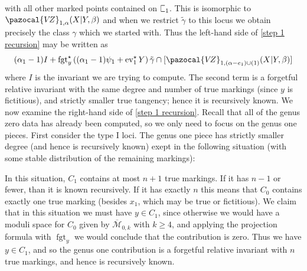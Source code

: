 \documentclass[11pt]{amsart}
\newcommand{\sqC}{\scalebox{0.8}[1.3]{$\sqsubset$}}
\newcommand{\VZ}{\pazocal{V\!Z}}
\newcommand{\st}{\star}
\newcommand{\ev}{\operatorname{ev}}
\newcommand{\fgt}{\operatorname{fgt}}
\newcommand{\Mcal}{\mathcal{M}}
\newcommand{\ol}[1]{\overline{#1}}
\theoremstyle{definition}
\theoremstyle{definition}
\begin{document}
with all other marked points contained on $\sqC_1$. This is isomorphic to $\VZ_{1,\alpha}(X|Y,\beta)$ and when we restrict $\tilde\gamma$ to this locus we obtain precisely the class $\gamma$ which we started with. Thus the left-hand side of \eqref{step 1 recursion} may be written as
\begin{equation*} (\alpha_1-1) I + \fgt_y^\st \left( (\alpha_1-1)\psi_1 + \ev_1^\st Y\right)  \tilde\gamma \cap [\VZ_{1,(\alpha-e_1)\cup(1)}(X|Y,\beta)]\end{equation*}
where $I$ is the invariant we are trying to compute. The second term is a forgetful relative invariant with the same degree and number of true markings (since $y$ is fictitious), and strictly smaller true tangency; hence it is recursively known. We now examine the right-hand side of \eqref{step 1 recursion}. Recall that all of the genus zero data has already been computed, so we only need to focus on the genus one pieces. First consider the type I loci. The genus one piece has strictly smaller degree (and hence is recursively known) exept in the following situation (with some stable distribution of the remaining markings):
\begin{center}
\end{center}
In this situation, $C_1$ contains at most $n+1$ true markings. If it has $n-1$ or fewer, than it is known recursively. If it has exactly $n$ this means that $C_0$ contains exactly one true marking (besides $x_1$, which may be true or fictitious). We claim that in this situation we must have $y \in C_1$, since otherwise we would have a moduli space for $C_0$ given by $\ol\Mcal_{0,k}$ with $k \geq 4$, and  applying the projection formula with $\fgt_y$ we would conclude that the contribution is zero. Thus we have $y \in C_1$, and so the genus one contribution is a forgetful relative invariant with $n$ true markings, and hence is recursively known.
\end{document}
